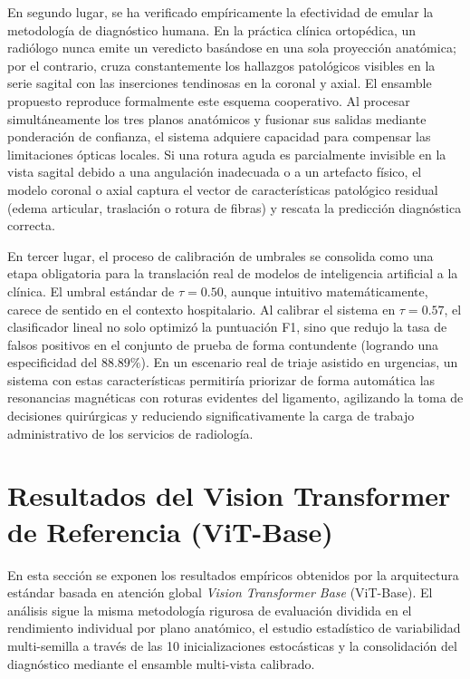 En segundo lugar, se ha verificado empíricamente la efectividad de emular la metodología de diagnóstico humana. En la práctica clínica ortopédica, un radiólogo nunca emite un veredicto basándose en una sola proyección anatómica; por el contrario, cruza constantemente los hallazgos patológicos visibles en la serie sagital con las inserciones tendinosas en la coronal y axial. El ensamble propuesto reproduce formalmente este esquema cooperativo. Al procesar simultáneamente los tres planos anatómicos y fusionar sus salidas mediante ponderación de confianza, el sistema adquiere capacidad para compensar las limitaciones ópticas locales. Si una rotura aguda es parcialmente invisible en la vista sagital debido a una angulación inadecuada o a un artefacto físico, el modelo coronal o axial captura el vector de características patológico residual (edema articular, traslación o rotura de fibras) y rescata la predicción diagnóstica correcta.

En tercer lugar, el proceso de calibración de umbrales se consolida como una etapa obligatoria para la translación real de modelos de inteligencia artificial a la clínica. El umbral estándar de $\tau = 0.50$, aunque intuitivo matemáticamente, carece de sentido en el contexto hospitalario. Al calibrar el sistema en $\tau = 0.57$, el clasificador lineal no solo optimizó la puntuación F1, sino que redujo la tasa de falsos positivos en el conjunto de prueba de forma contundente (logrando una especificidad del $88.89\%$). En un escenario real de triaje asistido en urgencias, un sistema con estas características permitiría priorizar de forma automática las resonancias magnéticas con roturas evidentes del ligamento, agilizando la toma de decisiones quirúrgicas y reduciendo significativamente la carga de trabajo administrativo de los servicios de radiología.


\section{Resultados del Vision Transformer de Referencia (ViT-Base)}
\label{sec:resultados_vitbase}

En esta sección se exponen los resultados empíricos obtenidos por la arquitectura estándar basada en atención global \textit{Vision Transformer Base} (ViT-Base). El análisis sigue la misma metodología rigurosa de evaluación dividida en el rendimiento individual por plano anatómico, el estudio estadístico de variabilidad multi-semilla a través de las 10 inicializaciones estocásticas y la consolidación del diagnóstico mediante el ensamble multi-vista calibrado.

